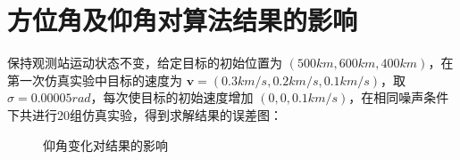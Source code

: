 \section{方位角及仰角对算法结果的影响}
保持观测站运动状态不变，给定目标的初始位置为 $(500km,600km,400km)$，在第一次仿真实验中目标的速度为 $\bm{v}=(0.3km/s,0.2km/s,0.1km/s)$，取 $\sigma=0.00005rad$，每次使目标的初始速度增加 $(0,0,0.1km/s)$，在相同噪声条件下共进行20组仿真实验，得到求解结果的误差图：
\begin{figure}[htbp]
	\centering

	\caption{仰角变化对结果的影响}
\end{figure}

